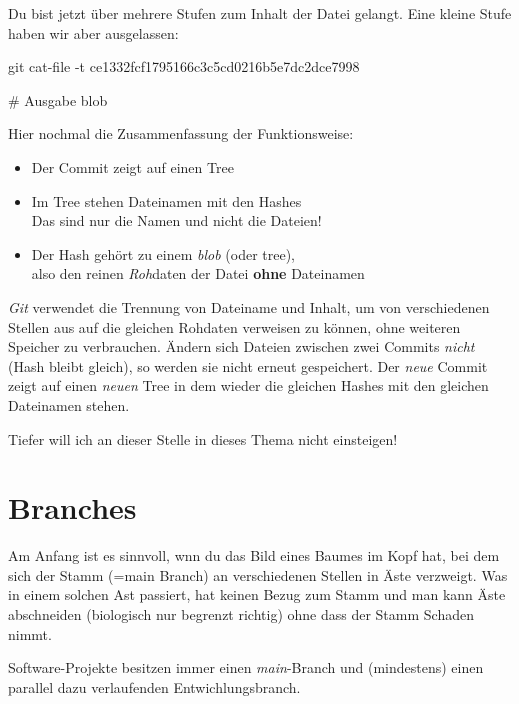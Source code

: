 \documentclass[
  ngerman,
  letterpaper,
  DIV=11]{scrreprt}
\newenvironment{Shaded}{\begin{snugshade}}{\end{snugshade}}
\newcommand{\AttributeTok}[1]{\textcolor[rgb]{0.40,0.45,0.13}{#1}}
\newcommand{\CommentTok}[1]{\textcolor[rgb]{0.37,0.37,0.37}{#1}}
\newcommand{\ExtensionTok}[1]{\textcolor[rgb]{0.00,0.23,0.31}{#1}}
\newcommand{\FunctionTok}[1]{\textcolor[rgb]{0.28,0.35,0.67}{#1}}
\newcommand{\NormalTok}[1]{\textcolor[rgb]{0.00,0.23,0.31}{#1}}
\providecommand{\tightlist}{%
  \setlength{\itemsep}{0pt}\setlength{\parskip}{0pt}}
\newcommand{\Git}{\textit{Git}\xspace}
\begin{document}
Du bist jetzt über mehrere Stufen zum Inhalt der Datei gelangt. Eine
kleine Stufe haben wir aber ausgelassen:

\begin{Shaded}
\begin{Highlighting}[]
\FunctionTok{git}\NormalTok{ cat{-}file }\AttributeTok{{-}t}\NormalTok{ ce1332fcf1795166c3c5cd0216b5e7dc2dce7998}

\CommentTok{\# Ausgabe}
\ExtensionTok{blob}
\end{Highlighting}
\end{Shaded}

Hier nochmal die Zusammenfassung der Funktionsweise:

\begin{itemize}
\tightlist
\item
  Der Commit zeigt auf einen Tree
\item
  Im Tree stehen Dateinamen mit den Hashes\\
  Das sind nur die Namen und nicht die Dateien!
\item
  Der Hash gehört zu einem \emph{blob} (oder tree),\\
  also den reinen \emph{Roh}daten der Datei \textbf{ohne} Dateinamen
\end{itemize}

\Git verwendet die Trennung von Dateiname und Inhalt, um von
verschiedenen Stellen aus auf die gleichen Rohdaten verweisen zu können,
ohne weiteren Speicher zu verbrauchen. Ändern sich Dateien zwischen zwei
Commits \emph{nicht} (Hash bleibt gleich), so werden sie nicht erneut
gespeichert. Der \emph{neue} Commit zeigt auf einen \emph{neuen} Tree in
dem wieder die gleichen Hashes mit den gleichen Dateinamen stehen.

Tiefer will ich an dieser Stelle in dieses Thema nicht einsteigen!


\chapter{Branches}\label{branches}

Am Anfang ist es sinnvoll, wnn du das Bild eines Baumes im Kopf hat, bei
dem sich der Stamm (=main Branch) an verschiedenen Stellen in Äste
verzweigt. Was in einem solchen Ast passiert, hat keinen Bezug zum Stamm
und man kann Äste abschneiden (biologisch nur begrenzt richtig) ohne
dass der Stamm Schaden nimmt.

Software-Projekte besitzen immer einen \emph{main}-Branch und
(mindestens) einen parallel dazu verlaufenden Entwichlungsbranch.
\end{document}
